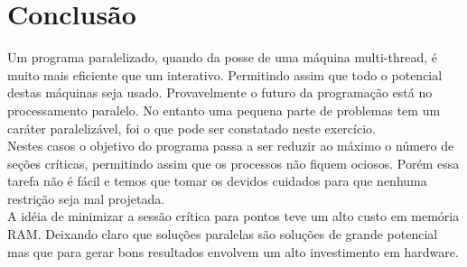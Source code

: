 \documentclass[12pt,a4paper]{article}
\begin{document}
\section{Conclusão}
Um programa paralelizado, quando da posse de uma máquina multi-thread,
é muito mais eficiente que um interativo. Permitindo assim que todo o potencial
destas máquinas seja usado. Provavelmente o futuro da programação está no processamento
paralelo. No entanto uma pequena parte de problemas tem um caráter paralelizável,
foi o que pode ser constatado neste exercício. \\
Nestes casos o objetivo do programa passa a ser reduzir ao máximo o número de seções 
críticas, permitindo assim que os processos não fiquem ociosos. Porém essa tarefa não é
fácil e temos que tomar os devidos cuidados para que nenhuma restrição seja mal projetada.\\
A idéia de minimizar a sessão crítica para pontos teve um alto custo em memória RAM. Deixando
claro que soluções paralelas são soluções de grande potencial mas que para gerar bons resultados
envolvem um alto investimento em hardware.
\end{document}
